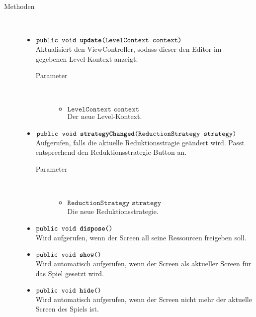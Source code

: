 \begin{description}
\item[Methoden] \hfill \\
	\vspace{-.8cm}
	\begin{itemize}
		\item $\texttt{public void \textbf{update}(LevelContext context)}$ \\ Aktualisiert den ViewController, sodass dieser den Editor im gegebenen Level-Kontext anzeigt.
		\begin{description}
			\item[Parameter] \hfill \\
			\vspace{-.8cm}
			\begin{itemize}
				\item $\texttt{LevelContext context}$ \\ Der neue Level-Kontext.
			\end{itemize}
		\end{description}
		
		\item $\texttt{public void \textbf{strategyChanged}(ReductionStrategy strategy)}$ \\ Aufgerufen, falls die aktuelle Reduktionsstragie geändert wird. Passt entsprechend den Reduktionsstrategie-Button an.
		\begin{description}
			\item[Parameter] \hfill \\
			\vspace{-.8cm}
			\begin{itemize}
				\item $\texttt{ReductionStrategy strategy}$ \\ Die neue Reduktionsstrategie.
			\end{itemize}
		\end{description}
				
		\item $\texttt{public void \textbf{dispose}()}$ \\ Wird aufgerufen, wenn der Screen all seine Ressourcen freigeben soll.
		
		\item $\texttt{public void \textbf{show}()}$ \\ Wird automatisch aufgerufen, wenn der Screen als aktueller Screen für das Spiel gesetzt wird.
	
		\item $\texttt{public void \textbf{hide}()}$ \\ Wird automatisch aufgerufen, wenn der Screen nicht mehr der aktuelle Screen des Spiels ist.
	

\end{itemize}
\end{description}
